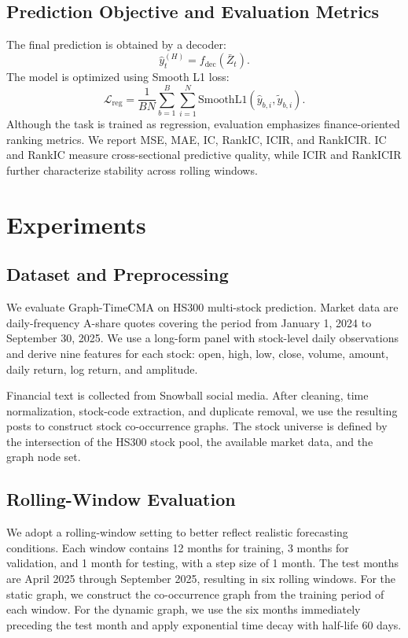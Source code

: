 \subsection{Prediction Objective and Evaluation Metrics}

The final prediction is obtained by a decoder:
\begin{equation}
\hat{y}^{(H)}_t = f_{\text{dec}}(\bar{Z}_t).
\end{equation}
The model is optimized using Smooth L1 loss:
\begin{equation}
\mathcal{L}_{\text{reg}} = \frac{1}{BN} \sum_{b=1}^{B} \sum_{i=1}^{N} \text{SmoothL1}(\hat{y}_{b,i}, \tilde{y}_{b,i}).
\end{equation}
Although the task is trained as regression, evaluation emphasizes finance-oriented ranking metrics. We report MSE, MAE, IC, RankIC, ICIR, and RankICIR. IC and RankIC measure cross-sectional predictive quality, while ICIR and RankICIR further characterize stability across rolling windows.

\section{Experiments}

\subsection{Dataset and Preprocessing}

We evaluate Graph-TimeCMA on HS300 multi-stock prediction. Market data are daily-frequency A-share quotes covering the period from January 1, 2024 to September 30, 2025. We use a long-form panel with stock-level daily observations and derive nine features for each stock: open, high, low, close, volume, amount, daily return, log return, and amplitude.

Financial text is collected from Snowball social media. After cleaning, time normalization, stock-code extraction, and duplicate removal, we use the resulting posts to construct stock co-occurrence graphs. The stock universe is defined by the intersection of the HS300 stock pool, the available market data, and the graph node set.

\subsection{Rolling-Window Evaluation}

We adopt a rolling-window setting to better reflect realistic forecasting conditions. Each window contains 12 months for training, 3 months for validation, and 1 month for testing, with a step size of 1 month. The test months are April 2025 through September 2025, resulting in six rolling windows. For the static graph, we construct the co-occurrence graph from the training period of each window. For the dynamic graph, we use the six months immediately preceding the test month and apply exponential time decay with half-life 60 days.

